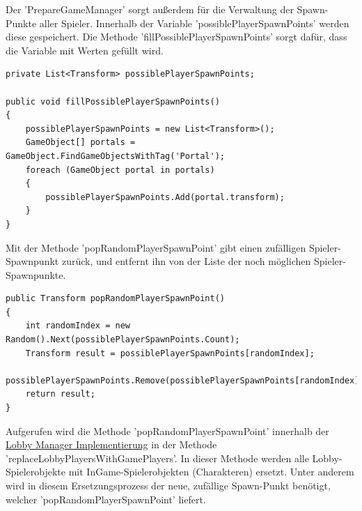 Der 'PrepareGameManager' sorgt außerdem für die Verwaltung der Spawn-Punkte aller Spieler. Innerhalb der Variable 'possiblePlayerSpawnPoints' werden diese gespeichert. Die Methode 'fillPossiblePlayerSpawnPoints' sorgt dafür, dass die Variable mit Werten gefüllt wird.

\begin{lstlisting}[caption= PrepareGameManager.cs fillPossiblePlayerSpawnPoints()]
private List<Transform> possiblePlayerSpawnPoints;

public void fillPossiblePlayerSpawnPoints()
{
	possiblePlayerSpawnPoints = new List<Transform>();
	GameObject[] portals = GameObject.FindGameObjectsWithTag('Portal');
	foreach (GameObject portal in portals)
	{
		possiblePlayerSpawnPoints.Add(portal.transform);
	}
}
\end{lstlisting}

Mit der Methode 'popRandomPlayerSpawnPoint' gibt einen zufälligen Spieler-Spawnpunkt zurück, und entfernt ihn von der Liste der noch möglichen Spieler-Spawnpunkte.

\begin{lstlisting}[caption= PrepareGameManager.cs popRandomPlayerSpawnPoint()]
public Transform popRandomPlayerSpawnPoint()
{
	int randomIndex = new Random().Next(possiblePlayerSpawnPoints.Count);
	Transform result = possiblePlayerSpawnPoints[randomIndex];
	possiblePlayerSpawnPoints.Remove(possiblePlayerSpawnPoints[randomIndex]);
	return result;
}
\end{lstlisting}

Aufgerufen wird die Methode 'popRandomPlayerSpawnPoint' innerhalb der \hyperref[Lobby Manager Implementierung]{Lobby Manager Implementierung} in der Methode 'replaceLobbyPlayersWithGamePlayers'. In dieser Methode werden alle Lobby-Spielerobjekte mit InGame-Spielerobjekten (Charakteren) ersetzt. Unter anderem wird in diesem Ersetzungsprozess der neue, zufällige Spawn-Punkt benötigt, welcher 'popRandomPlayerSpawnPoint' liefert.

